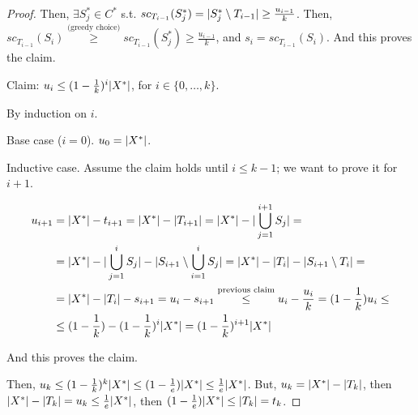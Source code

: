 \begin{proof}
        Then, $\exists S_j^* \in C^*$ s.t. $sc_{T_{i-1}}(S_j^*) = \vert S_j^* \setminus T_{i-1} \vert \geq \frac{u_{i-1}}{k}$.
        Then, $sc_{T_{i-1}}(S_i) \overset{\text{(greedy choice)}}{\geq} sc_{T_{i-1}}(S_j^*) \geq \frac{u_{i-1}}{k}$, and $s_i = sc_{T_{i-1}}(S_i)$. And this proves the claim.

        Claim: $u_i \leq (1 - \frac{1}{k})^i \vert X^* \vert$, for $i \in \{ 0, \dots, k \}$.

        By induction on $i$.

        Base case ($i=0$). $u_0 = \vert X^* \vert$.

        Inductive case. Assume the claim holds until $i \leq k-1$; we want to prove it for $i+1$.

        
        \begin{equation*}
            \begin{split}
                u_{i+1} &= \vert X^* \vert - t_{i+1} = \vert X^* \vert - \vert T_{i+1} \vert = \vert X^* \vert - \vert \bigcup_{j=1}^{i+1} S_j \vert =\\
                        &= \vert X^* \vert - \vert \bigcup_{j=1}^{i} S_j \vert - \vert S_{i+1} \setminus \bigcup_{i=1}^i S_j \vert = \vert X^* \vert - \vert T_i \vert - \vert S_{i+1} \setminus T_i \vert =\\
                        &= \vert X^* \vert - \vert T_i \vert - s_{i+1} = u_i - s_{i+1} \overset{\text{previous claim}}{\leq} u_i - \frac{u_i}{k} = (1 - \frac{1}{k})u_i \leq\\
                        &\leq (1 - \frac{1}{k}) - (1 - \frac{1}{k})^i \vert X^* \vert = (1 - \frac{1}{k})^{i+1} \vert X^* \vert
            \end{split}
        \end{equation*}

        And this proves the claim.

        Then, $u_k \leq (1 - \frac{1}{k})^k \vert X^* \vert \leq (1 - \frac{1}{e}) \vert X^* \vert \leq \frac{1}{e} \vert X^* \vert$.
        But, $u_k = \vert X^* \vert - \vert T_k \vert$, then $\vert X^* \vert - \vert T_k \vert = u_k \leq \frac{1}{e} \vert X^* \vert$, then $(1 - \frac{1}{e}) \vert X^* \vert \leq \vert T_k \vert = t_k$.
        
    \end{proof}